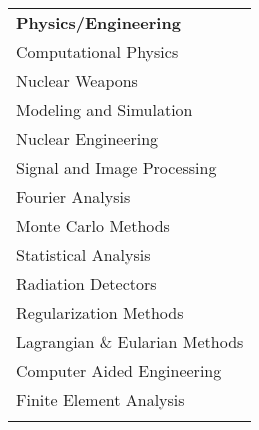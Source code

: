 
\begin{minipage}{0.31\textwidth}
\begin{tabular}{l}
	{\large\textbf{Physics/Engineering}} \\
	\highskillbw Computational Physics \\
	\highskillbw Nuclear Weapons \\
	\highskillbw Modeling and Simulation \\
	\highskillbw Nuclear Engineering \\
	\highskillbw Signal and Image Processing \\
	\highskillbw Fourier Analysis \\ 
	\highskillbw Monte Carlo Methods \\
	\medskillbw Statistical Analysis \\
	\medskillbw Radiation Detectors \\
	\medskillbw Regularization Methods  \\
	\medskillbw Lagrangian \& Eularian Methods \\
	\lowskillbw Computer Aided Engineering \\
	\lowskillbw Finite Element Analysis \\
	\\
\end{tabular}
\end{minipage}%
